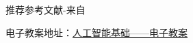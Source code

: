 \begin{overview}
\thispagestyle{empty}
%
%


推荐参考文献-来自

电子教案地址：\href{https://github.com/zggl/AITeachingPlanDraft2020/}{人工智能基础——电子教案}
\end{overview}
